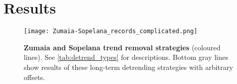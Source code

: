 \documentclass[draft]{agujournal2019}
\begin{document}


\section{Results}\label{sec:results}

\begin{figure}[htbp]
  \centering
  \texttt{[image: Zumaia-Sopelana\_records\_complicated.png]}
  \caption{\label{fig:detrend}
  \textbf{Zumaia and Sopelana trend removal strategies} (coloured lines).
  See \cref{tab:detrend_types} for descriptions.
  Bottom gray lines show results of these long-term detrending strategies with arbitrary offsets.}
\end{figure}
\end{document}
